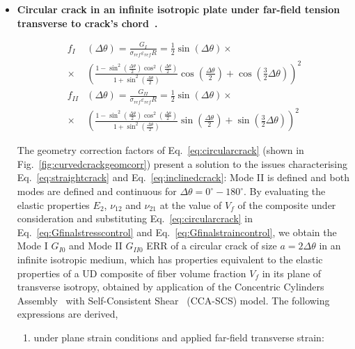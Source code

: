 \documentclass[review]{elsarticle}
\begin{document}
\begin{itemize}
\item \textbf{Circular crack in an infinite isotropic plate under far-field tension transverse to crack's chord~\cite{Ioakmidis1977}.}

\begin{equation}\label{eq:circularcrack}
\begin{aligned}
f_{I}&\left(\Delta\theta\right)=\frac{G_{I}}{\sigma_{ref}\varepsilon_{ref}R}=\frac{1}{2}\sin\left(\Delta\theta\right)\times\\\times&\left(\frac{1-\sin^{2}\left(\frac{\Delta\theta}{2}\right)\cos^{2}\left(\frac{\Delta\theta}{2}\right)}{1+\sin^{2}\left(\frac{\Delta\theta}{2}\right)}\cos\left(\frac{\Delta\theta}{2}\right)+\cos\left(\frac{3}{2}\Delta\theta\right)\right)^{2}\\
 f_{II}&\left(\Delta\theta\right)=\frac{G_{II}}{\sigma_{ref}\varepsilon_{ref}R}=\frac{1}{2}\sin\left(\Delta\theta\right)\times\\\times&\left(\frac{1-\sin^{2}\left(\frac{\Delta\theta}{2}\right)\cos^{2}\left(\frac{\Delta\theta}{2}\right)}{1+\sin^{2}\left(\frac{\Delta\theta}{2}\right)}\sin\left(\frac{\Delta\theta}{2}\right)+\sin\left(\frac{3}{2}\Delta\theta\right)\right)^{2}
\end{aligned}
\end{equation}

The geometry correction factors of Eq.~\ref{eq:circularcrack} (shown in Fig.~\ref{fig:curvedcrackgeomcorr}) present a solution to the issues characterising Eq.~\ref{eq:straightcrack} and Eq.~\ref{eq:inclinedcrack}: Mode II is defined and both modes are defined and continuous for $\Delta\theta=0^{\circ}-180^{\circ}$. By evaluating the elastic properties $E_{2}$, $\nu_{12}$ and $\nu_{21}$ at the value of $V_{f}$ of the composite under consideration and substituting Eq.~\ref{eq:circularcrack} in Eq.~\ref{eq:Gfinalstresscontrol} and Eq.~\ref{eq:Gfinalstraincontrol}, we obtain the Mode I $G_{I0}$ and Mode II $G_{II0}$ ERR of a circular crack of size $a=2\Delta\theta$ in an infinite isotropic medium, which has properties equivalent to the elastic properties of a UD composite of fiber volume fraction $V_{f}$ in its plane of transverse isotropy, obtained by application of the Concentric Cylinders Assembly~\cite{Hashin1983} with Self-Consistent Shear~\cite{Christensen1979} (CCA-SCS) model. The following expressions are derived,

\begin{enumerate}

\item under plane strain conditions and applied far-field transverse strain:


\end{enumerate}
\end{itemize}
\end{document}
